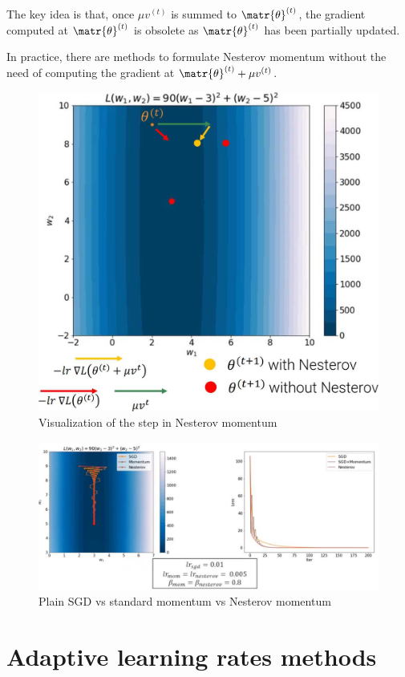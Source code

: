 \begin{description}
        \begin{remark}
            The key idea is that, once $\mu v^{(t)}$ is summed to $\matr{\theta}^{(t)}$, the gradient computed at $\matr{\theta}^{(t)}$ is obsolete as $\matr{\theta}^{(t)}$ has been partially updated.
        \end{remark}

        \begin{remark}
            In practice, there are methods to formulate Nesterov momentum without the need of computing the gradient at $\matr{\theta}^{(t)} + \mu v^{(t)}$.
        \end{remark}

        \begin{figure}[H]
            \centering
            \includegraphics[width=0.35\linewidth]{./img/nesterov_momentum.jpg}
            \caption{Visualization of the step in Nesterov momentum}
        \end{figure}

        \begin{figure}[H]
            \centering
            \includegraphics[width=0.75\linewidth]{./img/nesterov_comparison.jpg}
            \caption{Plain SGD vs standard momentum vs Nesterov momentum}
        \end{figure}
\end{description}



\section{Adaptive learning rates methods}

